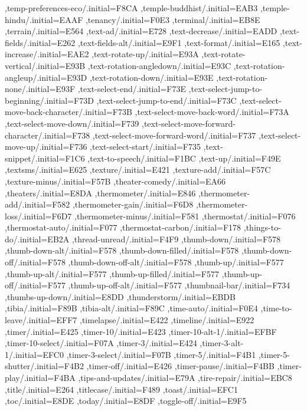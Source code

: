 { ,temp-preferences-eco/.initial=F8CA
 ,temple-buddhist/.initial=EAB3
 ,temple-hindu/.initial=EAAF
 ,tenancy/.initial=F0E3
 ,terminal/.initial=EB8E
 ,terrain/.initial=E564
 ,text-ad/.initial=E728
 ,text-decrease/.initial=EADD
 ,text-fields/.initial=E262
 ,text-fields-alt/.initial=E9F1
 ,text-format/.initial=E165
 ,text-increase/.initial=EAE2
 ,text-rotate-up/.initial=E93A
 ,text-rotate-vertical/.initial=E93B
 ,text-rotation-angledown/.initial=E93C
 ,text-rotation-angleup/.initial=E93D
 ,text-rotation-down/.initial=E93E
 ,text-rotation-none/.initial=E93F
 ,text-select-end/.initial=F73E
 ,text-select-jump-to-beginning/.initial=F73D
 ,text-select-jump-to-end/.initial=F73C
 ,text-select-move-back-character/.initial=F73B
 ,text-select-move-back-word/.initial=F73A
 ,text-select-move-down/.initial=F739
 ,text-select-move-forward-character/.initial=F738
 ,text-select-move-forward-word/.initial=F737
 ,text-select-move-up/.initial=F736
 ,text-select-start/.initial=F735
 ,text-snippet/.initial=F1C6
 ,text-to-speech/.initial=F1BC
 ,text-up/.initial=F49E
 ,textsms/.initial=E625
 ,texture/.initial=E421
 ,texture-add/.initial=F57C
 ,texture-minus/.initial=F57B
 ,theater-comedy/.initial=EA66
 ,theaters/.initial=E8DA
 ,thermometer/.initial=E846
 ,thermometer-add/.initial=F582
 ,thermometer-gain/.initial=F6D8
 ,thermometer-loss/.initial=F6D7
 ,thermometer-minus/.initial=F581
 ,thermostat/.initial=F076
 ,thermostat-auto/.initial=F077
 ,thermostat-carbon/.initial=F178
 ,things-to-do/.initial=EB2A
 ,thread-unread/.initial=F4F9
 ,thumb-down/.initial=F578
 ,thumb-down-alt/.initial=F578
 ,thumb-down-filled/.initial=F578
 ,thumb-down-off/.initial=F578
 ,thumb-down-off-alt/.initial=F578
 ,thumb-up/.initial=F577
 ,thumb-up-alt/.initial=F577
 ,thumb-up-filled/.initial=F577
 ,thumb-up-off/.initial=F577
 ,thumb-up-off-alt/.initial=F577
 ,thumbnail-bar/.initial=F734
 ,thumbs-up-down/.initial=E8DD
 ,thunderstorm/.initial=EBDB
 ,tibia/.initial=F89B
 ,tibia-alt/.initial=F89C
 ,time-auto/.initial=F0E4
 ,time-to-leave/.initial=EFF7
 ,timelapse/.initial=E422
 ,timeline/.initial=E922
 ,timer/.initial=E425
 ,timer-10/.initial=E423
 ,timer-10-alt-1/.initial=EFBF
 ,timer-10-select/.initial=F07A
 ,timer-3/.initial=E424
 ,timer-3-alt-1/.initial=EFC0
 ,timer-3-select/.initial=F07B
 ,timer-5/.initial=F4B1
 ,timer-5-shutter/.initial=F4B2
 ,timer-off/.initial=E426
 ,timer-pause/.initial=F4BB
 ,timer-play/.initial=F4BA
 ,tips-and-updates/.initial=E79A
 ,tire-repair/.initial=EBC8
 ,title/.initial=E264
 ,titlecase/.initial=F489
 ,toast/.initial=EFC1
 ,toc/.initial=E8DE
 ,today/.initial=E8DF
 ,toggle-off/.initial=E9F5
}
